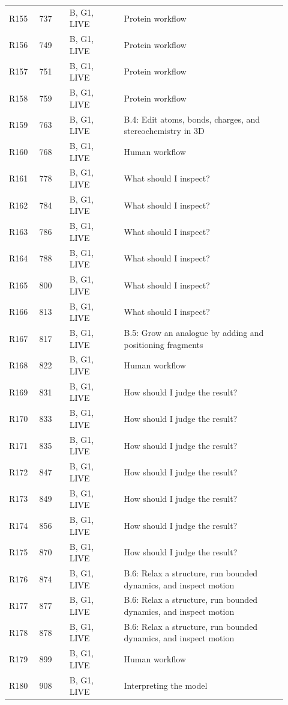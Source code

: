 \documentclass[11pt]{article}
\begin{document}
\begin{longtable}{@{}p{0.10\linewidth}p{0.10\linewidth}p{0.18\linewidth}p{0.54\linewidth}@{}}
R155 & 737 & B, G1, LIVE & Protein workflow \\
R156 & 749 & B, G1, LIVE & Protein workflow \\
R157 & 751 & B, G1, LIVE & Protein workflow \\
R158 & 759 & B, G1, LIVE & Protein workflow \\
R159 & 763 & B, G1, LIVE & B.4: Edit atoms, bonds, charges, and stereochemistry in 3D \\
R160 & 768 & B, G1, LIVE & Human workflow \\
R161 & 778 & B, G1, LIVE & What should I inspect? \\
R162 & 784 & B, G1, LIVE & What should I inspect? \\
R163 & 786 & B, G1, LIVE & What should I inspect? \\
R164 & 788 & B, G1, LIVE & What should I inspect? \\
R165 & 800 & B, G1, LIVE & What should I inspect? \\
R166 & 813 & B, G1, LIVE & What should I inspect? \\
R167 & 817 & B, G1, LIVE & B.5: Grow an analogue by adding and positioning fragments \\
R168 & 822 & B, G1, LIVE & Human workflow \\
R169 & 831 & B, G1, LIVE & How should I judge the result? \\
R170 & 833 & B, G1, LIVE & How should I judge the result? \\
R171 & 835 & B, G1, LIVE & How should I judge the result? \\
R172 & 847 & B, G1, LIVE & How should I judge the result? \\
R173 & 849 & B, G1, LIVE & How should I judge the result? \\
R174 & 856 & B, G1, LIVE & How should I judge the result? \\
R175 & 870 & B, G1, LIVE & How should I judge the result? \\
R176 & 874 & B, G1, LIVE & B.6: Relax a structure, run bounded dynamics, and inspect motion \\
R177 & 877 & B, G1, LIVE & B.6: Relax a structure, run bounded dynamics, and inspect motion \\
R178 & 878 & B, G1, LIVE & B.6: Relax a structure, run bounded dynamics, and inspect motion \\
R179 & 899 & B, G1, LIVE & Human workflow \\
R180 & 908 & B, G1, LIVE & Interpreting the model \\

\end{longtable}
\end{document}
